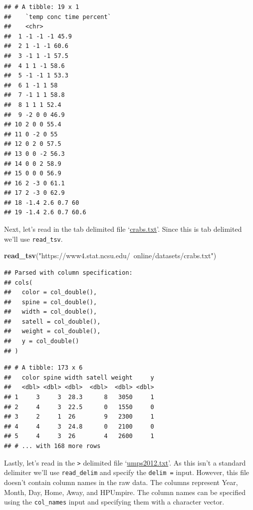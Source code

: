 \documentclass[
]{book}
\newenvironment{Shaded}{\begin{snugshade}}{\end{snugshade}}
\newcommand{\KeywordTok}[1]{\textcolor[rgb]{0.13,0.29,0.53}{\textbf{#1}}}
\newcommand{\NormalTok}[1]{#1}
\newcommand{\StringTok}[1]{\textcolor[rgb]{0.31,0.60,0.02}{#1}}
\theoremstyle{definition}
\theoremstyle{definition}
\theoremstyle{definition}
\theoremstyle{remark}
\begin{document}
\begin{verbatim}
## # A tibble: 19 x 1
##    `temp conc time percent`
##    <chr>                   
##  1 -1 -1 -1 45.9           
##  2 1 -1 -1 60.6            
##  3 -1 1 -1 57.5            
##  4 1 1 -1 58.6             
##  5 -1 -1 1 53.3            
##  6 1 -1 1 58               
##  7 -1 1 1 58.8             
##  8 1 1 1 52.4              
##  9 -2 0 0 46.9             
## 10 2 0 0 55.4              
## 11 0 -2 0 55               
## 12 0 2 0 57.5              
## 13 0 0 -2 56.3             
## 14 0 0 2 58.9              
## 15 0 0 0 56.9              
## 16 2 -3 0 61.1             
## 17 2 -3 0 62.9             
## 18 -1.4 2.6 0.7 60         
## 19 -1.4 2.6 0.7 60.6
\end{verbatim}

Next, let's read in the tab delimited file `\href{https://www4.stat.ncsu.edu/~online/datasets/crabs.txt}{crabs.txt}'. Since this is tab delimited we'll use \texttt{read\_tsv}.

\begin{Shaded}
\begin{Highlighting}[]
\KeywordTok{read_tsv}\NormalTok{(}\StringTok{"https://www4.stat.ncsu.edu/~online/datasets/crabs.txt"}\NormalTok{)}
\end{Highlighting}
\end{Shaded}

\begin{verbatim}
## Parsed with column specification:
## cols(
##   color = col_double(),
##   spine = col_double(),
##   width = col_double(),
##   satell = col_double(),
##   weight = col_double(),
##   y = col_double()
## )
\end{verbatim}

\begin{verbatim}
## # A tibble: 173 x 6
##   color spine width satell weight     y
##   <dbl> <dbl> <dbl>  <dbl>  <dbl> <dbl>
## 1     3     3  28.3      8   3050     1
## 2     4     3  22.5      0   1550     0
## 3     2     1  26        9   2300     1
## 4     4     3  24.8      0   2100     0
## 5     4     3  26        4   2600     1
## # ... with 168 more rows
\end{verbatim}

Lastly, let's read in the \texttt{\textgreater{}} delimited file `\href{https://www4.stat.ncsu.edu/~online/datasets/umps2012.txt}{umps2012.txt}'. As this isn't a standard delimiter we'll use \texttt{read\_delim} and specify the \texttt{delim\ =} input. However, this file doesn't contain column names in the raw data. The columns represent Year, Month, Day, Home, Away, and HPUmpire. The column names can be specified using the \texttt{col\_names} input and specifying them with a character vector.
\end{document}
